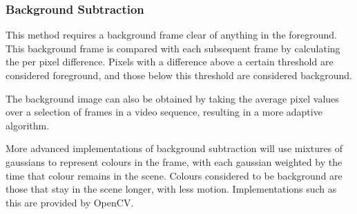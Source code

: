 \subsubsection{Background Subtraction}

This method requires a background frame clear of anything in the foreground. This background frame is compared with each subsequent frame by calculating the per pixel difference. Pixels with a difference above a certain threshold are considered foreground, and those below this threshold are considered background.

The background image can also be obtained by taking the average pixel values over a selection of frames in a video sequence, resulting in a more adaptive algorithm.

More advanced implementations of background subtraction will use mixtures of gaussians to represent colours in the frame, with each gaussian weighted by the time that colour remains in the scene\cite{backgroundsubmog}. Colours considered to be background are those that stay in the scene longer, with less motion. Implementations such as this are provided by OpenCV\cite{opencv}.